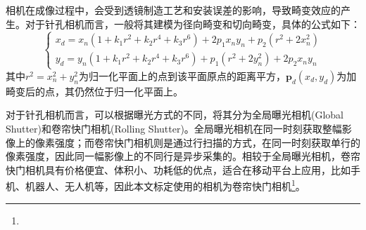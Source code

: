 相机在成像过程中，会受到透镜制造工艺和安装误差的影响，导致畸变效应的产生。对于针孔相机而言，一般将其建模为径向畸变和切向畸变\cite{高翔2017视觉}，具体的公式如下：
\begin{equation}
  \label{equ:cam_pinhole_dist}
  \begin{cases}
    x_d=x_n(1+k_1r^2+k_2r^4+k_3r^6)+2p_1x_ny_n+p_2(r^2+2x_n^2) \\
    y_d=y_n(1+k_1r^2+k_2r^4+k_3r^6)+p_1(r^2+2y_n^2)+2p_2x_ny_n
  \end{cases}
\end{equation}
其中$r^2=x_n^2+y_n^2$为归一化平面上的点到该平面原点的距离平方，$\boldsymbol{p}_d\left( x_d,y_d	\right) $为加畸变后的点，其仍然位于归一化平面上。

对于针孔相机而言，可以根据曝光方式的不同，将其分为全局曝光相机(Global Shutter)和卷帘快门相机(Rolling Shutter)。全局曝光相机在同一时刻获取整幅影像上的像素强度；而卷帘快门相机则是通过行扫描的方式，在同一时刻获取单行的像素强度，因此同一幅影像上的不同行是异步采集的。相较于全局曝光相机，卷帘快门相机具有价格便宜、体积小、功耗低的优点，适合在移动平台上应用，比如手机、机器人、无人机等，因此本文标定使用的相机为卷帘快门相机\footnote{}。

